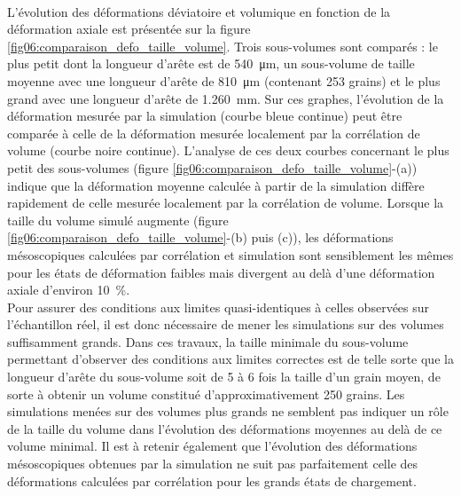			\\L'évolution des déformations déviatoire et volumique en fonction de la déformation axiale est présentée sur la figure \ref{fig06:comparaison_defo_taille_volume}. Trois sous-volumes sont comparés : le plus petit dont la longueur d'arête est de \SI{540}{\micro\meter}, un sous-volume de taille moyenne avec une longueur d'arête de \SI{810}{\micro\meter} (contenant \num{253} grains) et le plus grand avec une longueur d'arête de \SI{1.260}{\milli\meter}. Sur ces graphes, l'évolution de la déformation mesurée par la simulation (courbe bleue continue) peut être comparée à celle de la déformation mesurée localement par la corrélation de volume (courbe noire continue). L'analyse de ces deux courbes concernant le plus petit des sous-volumes (figure \ref{fig06:comparaison_defo_taille_volume}-(a)) indique que la déformation moyenne calculée à partir de la simulation diffère rapidement de celle mesurée localement par la corrélation de volume. Lorsque la taille du volume simulé augmente (figure \ref{fig06:comparaison_defo_taille_volume}-(b) puis (c)), les déformations mésoscopiques calculées par corrélation et simulation sont sensiblement les mêmes pour les états de déformation faibles mais divergent au delà d'une déformation axiale d'environ \SI{10}{\percent}.
			\\Pour assurer des conditions aux limites quasi-identiques à celles observées sur l'échantillon réel, il est donc nécessaire de mener les simulations sur des volumes suffisamment grands. Dans ces travaux, la taille minimale du sous-volume permettant d'observer des conditions aux limites correctes est de telle sorte que la longueur d'arête du sous-volume soit de \num{5} à \num{6} fois la taille d'un grain moyen, de sorte à obtenir un volume constitué d'approximativement \num{250} grains. Les simulations menées sur des volumes plus grands ne semblent pas indiquer un rôle de la taille du volume dans l'évolution des déformations moyennes au delà de ce volume minimal. Il est à retenir également que l'évolution des déformations mésoscopiques obtenues par la simulation ne suit pas parfaitement celle des déformations calculées par corrélation pour les grands états de chargement.
